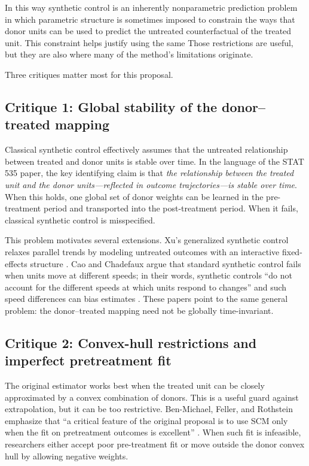 \documentclass[11pt]{article}
\begin{document}
In this way synthetic control is an inherently nonparametric prediction problem in which parametric structure is sometimes imposed to constrain the ways that donor units can be used to predict the untreated counterfactual of the treated unit. This constraint helps justify using the same Those restrictions are useful, but they are also where many of the method's limitations originate.

Three critiques matter most for this proposal.

\subsection{Critique 1: Global stability of the donor--treated mapping}

Classical synthetic control effectively assumes that the untreated relationship between treated and donor units is stable over time. In the language of the STAT 535 paper, the key identifying claim is that \emph{the relationship between the treated unit and the donor units---reflected in outcome trajectories---is stable over time}. When this holds, one global set of donor weights can be learned in the pre-treatment period and transported into the post-treatment period. When it fails, classical synthetic control is misspecified.

This problem motivates several extensions. Xu's generalized synthetic control relaxes parallel trends by modeling untreated outcomes with an interactive fixed-effects structure \citep{Xu2017}. Cao and Chadefaux argue that standard synthetic control fails when units move at different speeds; in their words, synthetic controls \enquote{do not account for the different speeds at which units respond to changes} and such speed differences can bias estimates \citep[p.~1]{Cao2025}. These papers point to the same general problem: the donor--treated mapping need not be globally time-invariant.

\subsection{Critique 2: Convex-hull restrictions and imperfect pretreatment fit}

The original estimator works best when the treated unit can be closely approximated by a convex combination of donors. This is a useful guard against extrapolation, but it can be too restrictive. Ben-Michael, Feller, and Rothstein emphasize that \enquote{a critical feature of the original proposal is to use SCM only when the fit on pretreatment outcomes is excellent} \citep[p.~1790]{BenMichael2021}. When such fit is infeasible, researchers either accept poor pre-treatment fit or move outside the donor convex hull by allowing negative weights.
\end{document}
